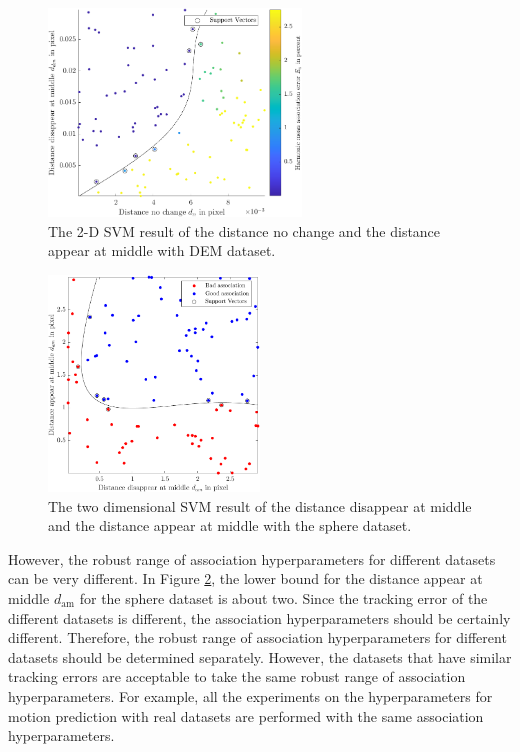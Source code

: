 \begin{figure}[htb]
\centering
\includegraphics[width=0.6\textwidth]{figures/Asso/2d svm.png}
\caption{The 2-D SVM result of the distance no change and the distance appear at middle with DEM dataset.}
\label{svm2}
\end{figure}

\begin{figure}[htb]
\centering
\includegraphics[width=0.5\textwidth,height=0.5\textwidth]{figures/Asso/2d svm sphere.png}
\caption{The two dimensional SVM result of the distance disappear at middle and the distance appear at middle with the sphere dataset.}
\label{svm3}
\end{figure}

However, the robust range of association hyperparameters for different datasets can be very different. In Figure \ref{svm3}, the lower bound for the distance appear at middle $d_{\mathrm{am}}$ for the sphere dataset is about two. Since the tracking error of the different datasets is different, the association hyperparameters should be certainly different. Therefore, the robust range of association hyperparameters for different datasets should be determined separately. However, the datasets that have similar tracking errors are acceptable to take the same robust range of association hyperparameters. For example, all the experiments on the hyperparameters for motion prediction with real datasets are performed with the same association hyperparameters.


